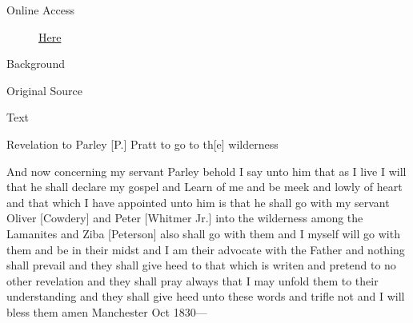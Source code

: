 			\begin{description}
				\item[Online Access] \href{https://www.josephsmithpapers.org/paper-summary/revelation-october-1830-a-dc-32/1}{Here}
			\end{description}
			
			\begin{description}
				\item[Background]
			\end{description}
			
			
			\begin{description}
				\item[Original Source]
			\end{description}
			
			
			\begin{description}
				\item[Text]
			\end{description}
			
				Revelation to Parley [P.] Pratt to go to th[e] wilderness
				
				And now concerning my servant Parley behold I say unto him that as I live I will that he shall declare my gospel and Learn of me and be meek and lowly of heart and that which I have appointed unto him is that he shall go with my servant Oliver [Cowdery] and Peter [Whitmer Jr.] into the wilderness among the Lamanites and Ziba [Peterson] also shall go with them and I myself will go with them and be in their midst and I am their advocate with the Father and nothing shall prevail and they shall give heed to that which is writen and pretend to no other revelation and they shall pray always that I may unfold them to their understanding and they shall give heed unto these words and trifle not and I will bless them amen Manchester Oct 1830---
				
